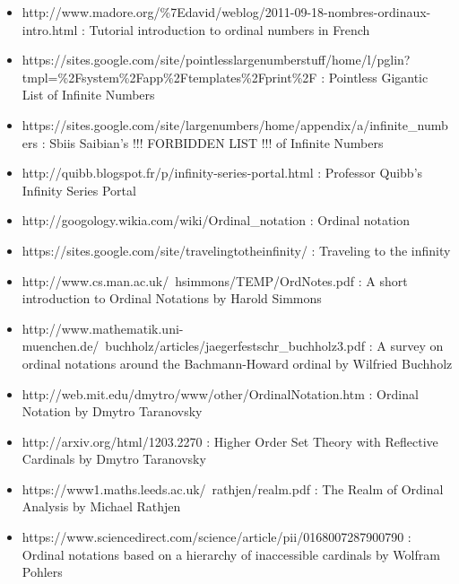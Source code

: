 \documentclass[10pt]{article}
\begin{document}
\begin{itemize}
     \setlength{\itemsep}{1pt}
     \setlength{\parskip}{0pt}
     \setlength{\parsep}{0pt}

\item http://www.madore.org/\%7Edavid/weblog/2011-09-18-nombres-ordinaux-intro.html :
Tutorial introduction to ordinal numbers in French

\item https://sites.google.com/site/pointlesslargenumberstuff/home/l/pglin?tmpl=\%2Fsystem\%2Fapp\%2Ftemplates\%2Fprint\%2F : 
Pointless Gigantic List of Infinite Numbers

\item https://sites.google.com/site/largenumbers/home/appendix/a/infinite\_numbers : 
Sbiis Saibian's !!! FORBIDDEN LIST !!! of Infinite Numbers

\item http://quibb.blogspot.fr/p/infinity-series-portal.html : 
Professor Quibb's Infinity Series Portal

\item http://googology.wikia.com/wiki/Ordinal\_notation : 
Ordinal notation

\item https://sites.google.com/site/travelingtotheinfinity/ : 
Traveling to the infinity

\item http://www.cs.man.ac.uk/~hsimmons/TEMP/OrdNotes.pdf : 
A short introduction to Ordinal Notations by Harold Simmons

\item http://www.mathematik.uni-muenchen.de/~buchholz/articles/jaegerfestschr\_buchholz3.pdf : 
A survey on ordinal notations around the Bachmann-Howard ordinal by Wilfried Buchholz

\item http://web.mit.edu/dmytro/www/other/OrdinalNotation.htm : 
Ordinal Notation by Dmytro Taranovsky

\item http://arxiv.org/html/1203.2270 : 
Higher Order Set Theory with Reflective Cardinals by Dmytro Taranovsky

\item https://www1.maths.leeds.ac.uk/~rathjen/realm.pdf : 
The Realm of Ordinal Analysis by Michael Rathjen

\item https://www.sciencedirect.com/science/article/pii/0168007287900790 :
Ordinal notations based on a hierarchy of inaccessible cardinals by Wolfram Pohlers


\end{itemize}
\end{document}
